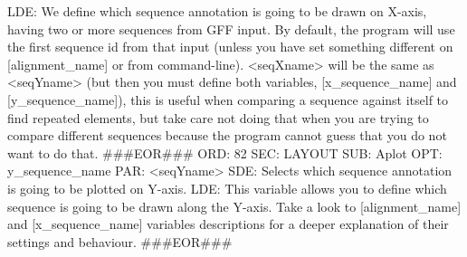 \documentclass[11pt]{article}
\def\nwendcode{\endtrivlist \endgroup} %
\let\nwdocspar=\par                    %
\begin{document}
LDE: 
We define which sequence annotation is going to be drawn on X-axis,
having two or more sequences from GFF input.
By default, the program will use the first sequence id from that input (unless
 you have set something different on [alignment_name] or from command-line).
<seqXname> will be the same as <seqYname> (but then you must define both 
variables, [x_sequence_name] and [y_sequence_name]), this is useful when 
comparing a sequence against itself to find repeated elements, but take care 
not doing that when you are trying to compare different sequences because the 
program cannot guess that you do not want to do that.
###EOR###
ORD: 82
SEC: LAYOUT
SUB: Aplot
OPT: y_sequence_name
PAR: <seqYname>
SDE: Selects which sequence annotation is going to be plotted on Y-axis.
LDE: 
This variable allows you to define which sequence is going to be drawn along
the Y-axis. Take a look to [alignment_name] and [x_sequence_name] variables 
descriptions for a deeper explanation of their settings and behaviour. 
###EOR###
\nwendcode{}\nwdocspar
\end{document}

